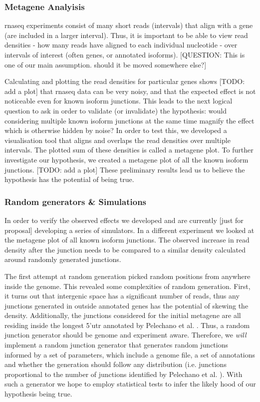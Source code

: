 \documentclass[12pt]{article}
\begin{document}
\subsubsection{Metagene Analyisis}\label{metagene}
\acrshort{rnaseq} experiments consist of many short reads (intervals) that align with a gene (are included in a larger interval). Thus, it is important to be able to view read densities - how many reads have aligned to each individual nucleotide - over intervals of interest (often genes, or annotated isoforms). {\tiny [QUESTION: This is one of our main assumption. should it be moved somewhere else?]} 

Calculating and plotting the read densities for particular genes shows {\tiny [TODO: add a plot]} that \acrshort{rnaseq} data can be very noisy, and that the expected effect is not noticeable even for known isoform junctions. This leads to the next logical question to ask in order to validate (or invalidate) the hypothesis: would considering multiple known isoform junctions at the same time magnify the effect which is otherwise hidden by noise? In order to test this, we developed a visualisation tool that aligns and overlaps the read densities over multiple intervals. The plotted sum of these densities is called a metagene plot. To further investigate our hypothesis, we created a metagene plot of all the known isoform junctions. {\tiny [TODO: add a plot]} These preliminary results lead us to believe the hypothesis has the potential of being true. 

\subsubsection{Random generators \& Simulations}\label{rng}
In order to verify the observed effects we developed and are currently {\tiny [just for proposal]} developing a series of simulators. In a different experiment we looked at the metagene plot of all known isoform junctions. The observed increase in read density after the junction needs to be compared to a similar density calculated around randomly generated junctions.

The first attempt at random generation picked random positions from anywhere inside the genome. This revealed some complexities of random generation. First, it turns out that intergenic space has a significant number of reads, thus any junctions generated in outside annotated genes has the potential of skewing the density. Additionally, the junctions considered for the initial metagene are all residing inside the longest 5'\acrshort{utr} annotated by Pelechano et al. \cite{Pelechano2013}. Thus, a random junction generator should be genome and experiment aware. Therefore, we \textit{will} implement a random junction generator that generates random junctions informed by a set of parameters, which include a genome file, a set of annotations and whether the 
generation should follow any distribution (i.e. junctions proportional to the number of junctions identified by Pelechano et al. \cite{Pelechano2013}). With such a generator we hope to employ statistical tests to infer the likely hood of our hypothesis being true. 
\end{document}
